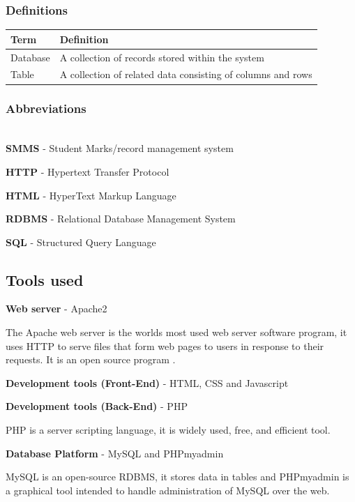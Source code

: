 \documentclass[10pt,onecolumn]{lab}
\begin{document}
\subsubsection{Definitions}
\begin{center}
    \begin{tabular}{ | p{3cm} | p{9cm} |}
\hline
\textbf{Term}& \textbf{Definition}\\ \hline
 Database & A collection of records stored within the system \\ \hline
 Table & A collection of related data consisting of columns and rows \\ \hline   
     \end{tabular}
\end{center}

\subsubsection{Abbreviations}~\\

\textbf{SMMS} - Student Marks/record management system

\textbf{HTTP} - Hypertext Transfer Protocol

\textbf{HTML} - HyperText Markup Language

\textbf{RDBMS} - Relational Database Management System

\textbf{SQL} - Structured Query Language

%
\subsection{Tools used}
\textbf{Web server} - Apache2

The Apache web server is the worlds most used web server software program, it uses HTTP to serve files that form web pages to users in response to their requests. It is an open source program \cite{ref5, ref6}. 

\textbf{Development tools (Front-End)} - HTML, CSS and Javascript

\textbf{Development tools (Back-End)} - PHP 

PHP is a server scripting language, it is widely used, free, and efficient tool.

\textbf{Database Platform} - MySQL and PHPmyadmin 

MySQL is an open-source RDBMS, it stores data in tables and PHPmyadmin is a graphical tool intended to handle administration of MySQL over the web.   
\end{document}
